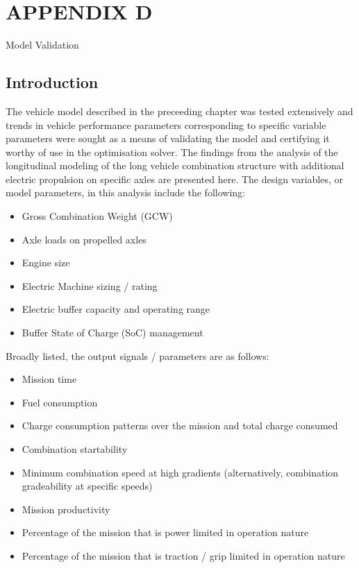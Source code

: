 \documentclass[ExampleMasters.tex]{subfiles}
\begin{document}
	\chapter{APPENDIX D}
	{\Large Model Validation}

	\section{Introduction}
	The vehicle model described in the preceeding chapter was tested extensively and trends in vehicle performance parameters corresponding to specific variable parameters were sought as a means of validating the model and certifying it worthy of use in the optimisation solver. The findings from the analysis of the longitudinal modeling of the long vehicle combination structure with additional electric propulsion on specific axles are presented here. The design variables, or model parameters, in this analysis include the following:
	\begin{itemize}
	\item Gross Combination Weight (GCW)
	\item Axle loads on propelled axles
	\item Engine size
	\item Electric Machine sizing / rating
	\item Electric buffer capacity and operating range
	\item Buffer State of Charge (SoC) management
	\end{itemize}
	Broadly listed, the output signals / parameters are as follows:
	\begin{itemize}
	\item Mission time
	\item Fuel consumption
	\item Charge consumption patterns over the mission and total charge consumed
	\item Combination startability
	\item Minimum combination speed at high gradients (alternatively, combination gradeability at specific speeds)
	\item Mission productivity
	\item Percentage of the mission that is power limited in operation nature
	\item Percentage of the mission that is traction / grip limited in operation nature
	\end{itemize}
\end{document}
